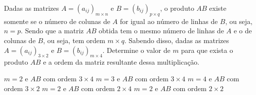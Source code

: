 Dadas as matrizes $A=(a_{ij})_{m\times n}$ e $B=(b_{ij})_{p\times q}$, o produto $AB$ existe somente se o número de colunas de $A$ for igual ao número de linhas de $B$, ou seja, $n=p$. Sendo que a matriz $AB$ obtida tem o mesmo número de linhas de $A$ e o de colunas de $B$, ou seja, tem ordem $m\times q$. Sabendo disso, dadas as matrizes $A=(a_{ij})_{3\times 2}$ e $B=(b_{ij})_{m\times 4}$. Determine o valor de $m$ para que exista o produto $AB$ e a ordem da matriz resultante dessa multiplicação.

$m=2$ e $AB$ com ordem $3\times 4$
$m=3$ e $AB$ com ordem $3\times 4$
$m=4$ e $AB$ com ordem $3\times 2$
$m=2$ e $AB$ com ordem $2\times 4$
$m=2$ e $AB$ com ordem $2\times 2$


